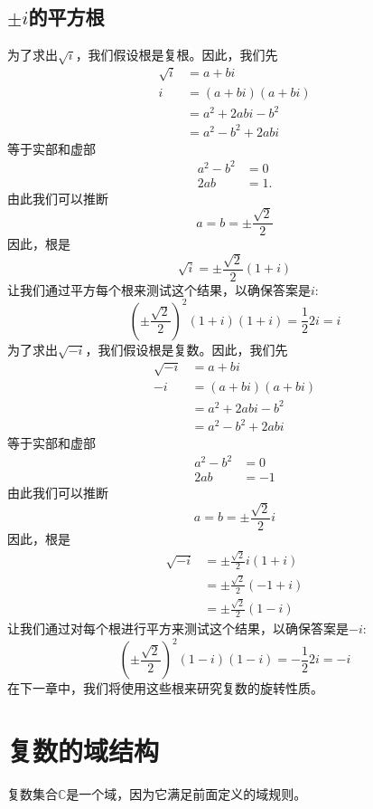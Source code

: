 \subsection{\boldmath $\pm i$的平方根}
为了求出$\sqrt{i}$，我们假设根是复根。因此，我们先
$$
  \begin{aligned}
    \sqrt{i} & =a+b i               \\
    i        & =(a+b i)(a+b i)      \\
             & =a^{2}+2 a b i-b^{2} \\
             & =a^{2}-b^{2}+2 a b i
  \end{aligned}
$$
等于实部和虚部
$$
  \begin{aligned}
    a^{2}-b^{2} & =0   \\
    2 a b       & =1 .
  \end{aligned}
$$
由此我们可以推断
$$
  a=b= \pm \frac{\sqrt{2}}{2}
$$
因此，根是
$$
  \sqrt{i}= \pm \frac{\sqrt{2}}{2}(1+i)
$$
让我们通过平方每个根来测试这个结果，以确保答案是$i$:
$$
  \left( \pm \frac{\sqrt{2}}{2}\right)^{2}(1+i)(1+i)=\frac{1}{2} 2 i=i
$$
为了求出$\sqrt{-i}$，我们假设根是复数。因此，我们先
$$
  \begin{aligned}
    \sqrt{-i} & =a+b i               \\
    -i        & =(a+b i)(a+b i)      \\
              & =a^{2}+2 a b i-b^{2} \\
              & =a^{2}-b^{2}+2 a b i
  \end{aligned}
$$
等于实部和虚部
$$
  \begin{aligned}
    a^{2}-b^{2} & =0  \\
    2 a b       & =-1
  \end{aligned}
$$
由此我们可以推断
$$
  a=b= \pm \frac{\sqrt{2}}{2} i
$$
因此，根是
$$
  \begin{aligned}
    \sqrt{-i} & = \pm \frac{\sqrt{2}}{2} i(1+i) \\
              & = \pm \frac{\sqrt{2}}{2}(-1+i)  \\
              & = \pm \frac{\sqrt{2}}{2}(1-i)
  \end{aligned}
$$
让我们通过对每个根进行平方来测试这个结果，以确保答案是$-i$:
$$
  \left( \pm \frac{\sqrt{2}}{2}\right)^{2}(1-i)(1-i)=-\frac{1}{2} 2 i=-i
$$
在下一章中，我们将使用这些根来研究复数的旋转性质。

\section{复数的域结构}
复数集合$\mathbb{C}$是一个域，因为它满足前面定义的域规则。

